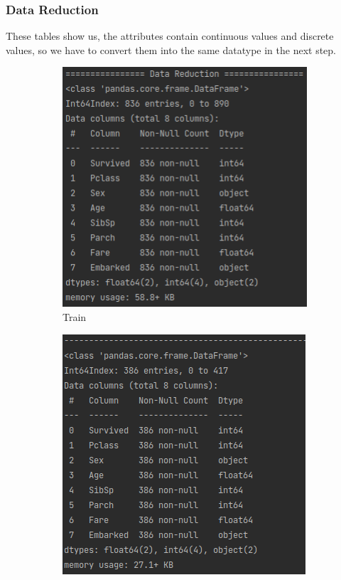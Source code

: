 \documentclass{beamer}
\begin{document}
\begin{frame}
\frametitle{Data Reduction}
	\begin{flushleft}
		These tables show us, the attributes contain continuous values and discrete values, so we have to convert them into the same datatype in the next step. 
	\end{flushleft}
	\begin{center}
		\begin{figure}
			\begin{subfigure}[p]{0.48\textwidth}
	        \includegraphics[width=\linewidth]{./src/figures/5_1.png}
	        \caption{Train}
	    \end{subfigure} \hfill
			\begin{subfigure}[p]{0.48\textwidth}
	        \includegraphics[width=\linewidth]{./src/figures/5_2.png}

\end{subfigure}
\end{figure}
\end{center}
\end{frame}
\end{document}
